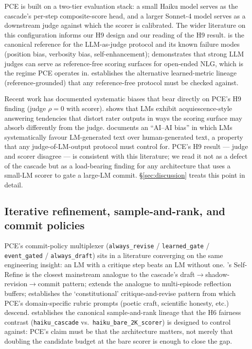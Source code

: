 PCE is built on a two-tier evaluation stack: a small Haiku model serves as the cascade's per-step composite-score head, and a larger Sonnet-4 model serves as a downstream judge against which the scorer is calibrated. The wider literature on this configuration informs our H9 design and our reading of the H9 result. \citet{ZhengEtAl2023JudgingLLMAsJudge} is the canonical reference for the LLM-as-judge protocol and its known failure modes (position bias, verbosity bias, self-enhancement); \citet{LiuEtAl2023GEval} demonstrates that strong LLM judges can serve as reference-free scoring surfaces for open-ended NLG, which is the regime PCE operates in. \citet{SellamEtAl2020BLEURT} establishes the alternative learned-metric lineage (reference-grounded) that any reference-free protocol must be checked against.

Recent work has documented systematic biases that bear directly on PCE's H9 finding (judge $\rho=0$ with scorer). \citet{Braun2025AcquiescenceBiasLLMs} shows that LMs exhibit acquiescence-style answering tendencies that distort rater outputs in ways the scoring surface may absorb differently from the judge. \citet{LauritoEtAl2025PNASAIAIBias} documents an ``AI--AI bias'' in which LMs systematically favour LM-generated text over human-generated text, a property that any judge-of-LM-output protocol must control for. PCE's H9 result --- judge and scorer disagree --- is consistent with this literature; we read it not as a defect of the cascade but as a load-bearing finding for any architecture that uses a small-LM scorer to gate a large-LM commit. \S\ref{sec:discussion} treats this point in detail.

\subsection{Iterative refinement, sample-and-rank, and commit policies}

PCE's commit-policy multiplexer (\texttt{always\_revise} / \texttt{learned\_gate} / \texttt{event\_gated} / \texttt{always\_draft}) sits in a literature converging on the same engineering insight: an LM with a critique step beats an LM without one. \citet{MadaanEtAl2023SelfRefineNeurIPS}'s Self-Refine is the closest mainstream analogue to the cascade's draft$\rightarrow$shadow-revision$\rightarrow$commit pattern; \citet{ShinnEtAl2023Reflexion} extends the analogue to multi-episode reflection buffers; \citet{BaiEtAl2022ConstitutionalAI} establishes the `constitutional' critique-and-revise pattern from which PCE's domain-specific rubric prompts (poetic craft, scientific honesty, etc.) descend. \citet{StiennonEtAl2020LearningToSummarizeFromHumanFeedback} establishes the canonical sample-and-rank lineage that the H6 fairness contrast (\texttt{haiku\_cascade} vs.\ \texttt{haiku\_bare\_2K\_scorer}) is designed to control against: PCE's claim must be that the architecture matters, not merely that doubling the candidate budget at the bare scorer is enough to close the gap.

